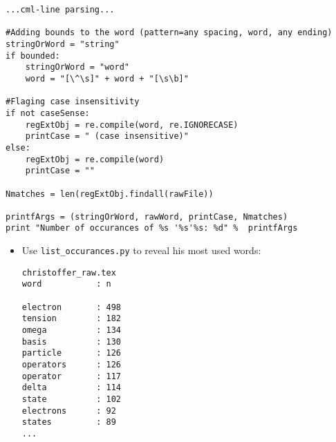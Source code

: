 \documentclass{beamer}
\begin{document}
\begin{frame}[containsverbatim]
\tiny
\begin{verbatim}
...cml-line parsing...

#Adding bounds to the word (pattern=any spacing, word, any ending)
stringOrWord = "string"
if bounded:
    stringOrWord = "word"
    word = "[\^\s]" + word + "[\s\b]"
    
#Flaging case insensitivity
if not caseSense:
    regExtObj = re.compile(word, re.IGNORECASE)
    printCase = " (case insensitive)"
else:
    regExtObj = re.compile(word)
    printCase = ""

Nmatches = len(regExtObj.findall(rawFile))

printfArgs = (stringOrWord, rawWord, printCase, Nmatches)
print "Number of occurances of %s '%s'%s: %d" %  printfArgs
\end{verbatim}
\normalsize
\end{frame}





\begin{frame}[containsverbatim]
\begin{itemize}

\item Use \verb+list_occurances.py+ to reveal his most used words:
 
\vspace{0.2cm}
\scriptsize
\begin{verbatim}
christoffer_raw.tex           
word           : n              

electron       : 498            
tension        : 182            
omega          : 134            
basis          : 130            
particle       : 126            
operators      : 126            
operator       : 117            
delta          : 114            
state          : 102            
electrons      : 92             
states         : 89    
...
\end{verbatim}
\normalsize
\end{itemize}
\end{frame}
\end{document}
